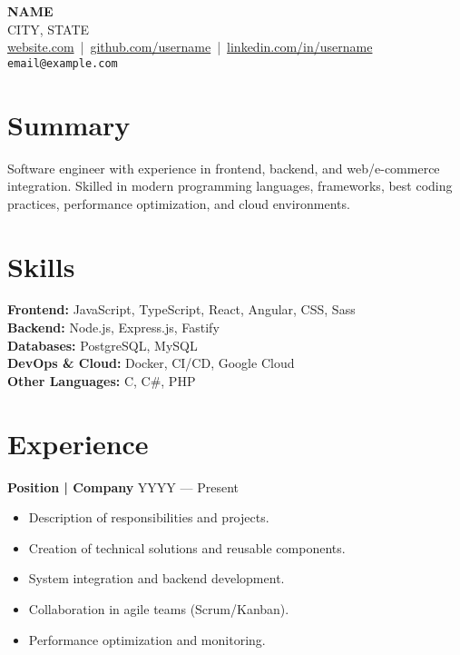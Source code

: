 \documentclass[a4paper,10pt]{article}
\begin{document}
\begin{center}
    {\LARGE \textbf{NAME}}\\[2mm]
    CITY, STATE \\[1mm]
    \href{https://example.com}{website.com} \,|\, 
    \href{https://github.com/username}{github.com/username} \,|\, 
    \href{https://www.linkedin.com/in/username/}{linkedin.com/in/username}\\[2mm]
    \texttt{email@example.com}
\end{center}

\vspace{0.3cm}

\section*{Summary}
Software engineer with experience in frontend, backend, and web/e-commerce integration. 
Skilled in modern programming languages, frameworks, best coding practices, performance optimization, and cloud environments.

\section*{Skills}
\textbf{Frontend:} JavaScript, TypeScript, React, Angular, CSS, Sass\\
\textbf{Backend:} Node.js, Express.js, Fastify\\
\textbf{Databases:} PostgreSQL, MySQL\\
\textbf{DevOps \& Cloud:} Docker, CI/CD, Google Cloud\\
\textbf{Other Languages:} C, C\#, PHP

\section*{Experience}
\textbf{Position | Company} \hfill YYYY — Present\\[-4pt]
\begin{itemize}[leftmargin=1.2em, noitemsep, topsep=3pt]
    \item Description of responsibilities and projects.
    \item Creation of technical solutions and reusable components.
    \item System integration and backend development.
    \item Collaboration in agile teams (Scrum/Kanban).
    \item Performance optimization and monitoring.
\end{itemize}
\end{document}
